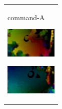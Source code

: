 \begin{figure}[H]
\begin{tabular}{l}
\begin{minipage}{0.165\hsize}
\begin{center}
          \hspace{0.0cm} {command-A}
        \end{center}
      \end{minipage}
      \begin{minipage}{0.165\hsize}
        \begin{center}
          \includegraphics[clip, width=2.5cm]{./Figures/optic_commandmatemate4.eps}
          \hspace{0.1cm} { }
        \end{center}
      \end{minipage}
      \begin{minipage}{0.165\hsize}
        \begin{center}
          \includegraphics[clip, width=2.5cm]{./Figures/optic_commandmatemate5.eps}
          \hspace{2.2cm} { }
        \end{center}
      \end{minipage}
\\ %


\end{tabular}
\end{figure}

